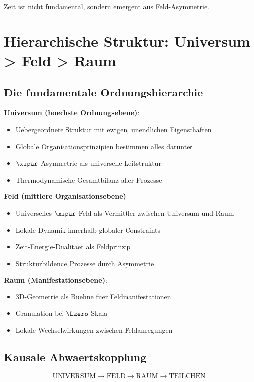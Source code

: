 	Zeit ist nicht fundamental, sondern emergent aus Feld-Asymmetrie.
	
	\section{Hierarchische Struktur: Universum > Feld > Raum}
	
	\subsection{Die fundamentale Ordnungshierarchie}
	
	\textbf{Universum (hoechste Ordnungsebene)}:
	\begin{itemize}
		\item Uebergeordnete Struktur mit ewigen, unendlichen Eigenschaften
		\item Globale Organisationsprinzipien bestimmen alles darunter
		\item $\xipar$-Asymmetrie als universelle Leitstruktur
		\item Thermodynamische Gesamtbilanz aller Prozesse
	\end{itemize}
	
	\textbf{Feld (mittlere Organisationsebene)}:
	\begin{itemize}
		\item Universelles $\xipar$-Feld als Vermittler zwischen Universum und Raum
		\item Lokale Dynamik innerhalb globaler Constraints
		\item Zeit-Energie-Dualitaet als Feldprinzip
		\item Strukturbildende Prozesse durch Asymmetrie
	\end{itemize}
	
	\textbf{Raum (Manifestationsebene)}:
	\begin{itemize}
		\item 3D-Geometrie als Buehne fuer Feldmanifestationen
		\item Granulation bei $\Lzero$-Skala
		\item Lokale Wechselwirkungen zwischen Feldanregungen
	\end{itemize}
	
	\subsection{Kausale Abwaertskopplung}
	
	\begin{equation}
		\text{UNIVERSUM} \rightarrow \text{FELD} \rightarrow \text{RAUM} \rightarrow \text{TEILCHEN}
	\end{equation}
	
